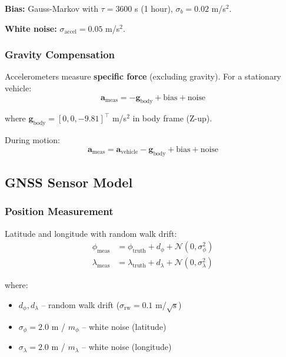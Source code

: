 \documentclass[11pt,a4paper]{article}
\begin{document}
\textbf{Bias:} Gauss-Markov with $\tau = 3600$ s (1 hour), $\sigma_b = 0.02$ m/s$^2$.

\textbf{White noise:} $\sigma_{\text{accel}} = 0.05$ m/s$^2$.

\subsubsection{Gravity Compensation}

Accelerometers measure \textbf{specific force} (excluding gravity). For a stationary vehicle:
\begin{equation}
\mathbf{a}_{\text{meas}} = -\mathbf{g}_{\text{body}} + \text{bias} + \text{noise}
\end{equation}

where $\mathbf{g}_{\text{body}} = [0, 0, -9.81]^\top$ m/s$^2$ in body frame (Z-up).

During motion:
\begin{equation}
\mathbf{a}_{\text{meas}} = \mathbf{a}_{\text{vehicle}} - \mathbf{g}_{\text{body}} + \text{bias} + \text{noise}
\end{equation}

\subsection{GNSS Sensor Model}

\subsubsection{Position Measurement}

Latitude and longitude with random walk drift:
\begin{align}
\phi_{\text{meas}} &= \phi_{\text{truth}} + d_{\phi} + \mathcal{N}(0, \sigma_{\phi}^2) \\
\lambda_{\text{meas}} &= \lambda_{\text{truth}} + d_{\lambda} + \mathcal{N}(0, \sigma_{\lambda}^2)
\end{align}

where:
\begin{itemize}
    \item $d_{\phi}, d_{\lambda}$ -- random walk drift ($\sigma_{\text{rw}} = 0.1$ m/$\sqrt{\text{s}}$)
    \item $\sigma_{\phi} = 2.0$ m / $m_{\phi}$ -- white noise (latitude)
    \item $\sigma_{\lambda} = 2.0$ m / $m_{\lambda}$ -- white noise (longitude)
\end{itemize}
\end{document}
